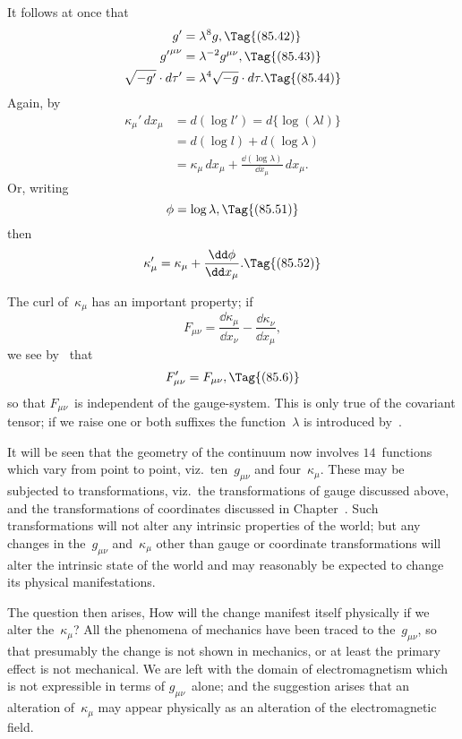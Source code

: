 \documentclass[12pt]{book}
\begin{document}
It follows at once that
%
\begin{align*}
g' & = \lambda^{8} g,
\Tag{(85.42)} \\
{g'}^{\mu\nu} &= \lambda^{-2} g^{\mu\nu},
\Tag{(85.43)} \\
\sqrt{-g'} \cdot d\tau' &= \lambda^{4} \sqrt{-g} \cdot d\tau.
\Tag{(85.44)}
\end{align*}
Again, by~
\begin{align*}
  \kappa_{\mu}'\, dx_{\mu}
  &= d(\log l') = d\{\log(\lambda l)\} \\
  &= d(\log l) + d(\log\lambda) \\
  &= \kappa_{\mu}\, dx_{\mu} + \frac{\dd(\log\lambda)}{\dd x_{\mu}}\, dx_{\mu}.
\end{align*}
Or, writing
\[
\phi = \log\lambda,
\Tag{(85.51)}
\]
then
\[
\kappa_{\mu}' = \kappa_{\mu} + \frac{\dd\phi}{\dd x_{\mu}}.
\Tag{(85.52)}
\]

The curl of~$\kappa_{\mu}$ has an important property; if
\[
F_{\mu\nu} = \frac{\dd\kappa_{\mu}}{\dd x_{\nu}} - \frac{\dd\kappa_{\nu}}{\dd x_{\mu}},
\]
we see by~ that
\[
F_{\mu\nu}' = F_{\mu\nu},
\Tag{(85.6)}
\]
so that $F_{\mu\nu}$~is independent of the gauge-system. This is only true of the covariant
tensor; if we raise one or both suffixes the function~$\lambda$ is introduced
by~.

It will be seen that the geometry of the continuum now involves $14$~functions
which vary from point to point, viz.\ ten~$g_{\mu\nu}$ and four~$\kappa_{\mu}$. These may be subjected
to transformations, viz.\ the transformations of gauge discussed above,
and the transformations of coordinates discussed in Chapter~\@. Such transformations
will not alter any intrinsic properties of the world; but any changes
in the~$g_{\mu\nu}$ and~$\kappa_{\mu}$ other than gauge or coordinate transformations will alter the
intrinsic state of the world and may reasonably be expected to change its
physical manifestations.

The question then arises, How will the change manifest itself physically if
we alter the~$\kappa_{\mu}$? All the phenomena of mechanics have been traced to the~$g_{\mu\nu}$,
so that presumably the change is not shown in mechanics, or at least the
primary effect is not mechanical. We are left with the domain of electromagnetism
which is not expressible in terms of $g_{\mu\nu}$~alone; and the suggestion
arises that an alteration of~$\kappa_{\mu}$ may appear physically as an alteration of the
electromagnetic field.
\end{document}
